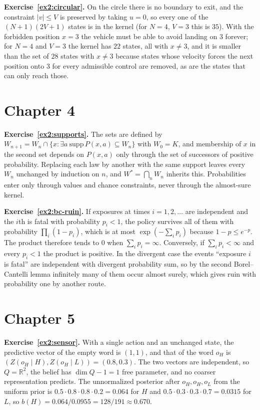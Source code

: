 \textbf{Exercise~\ref{ex2:circular}.} On the circle there is no boundary to exit, and the constraint $|v|\le V$ is preserved by taking $u=0$, so every one of the $(N+1)(2V+1)$ states is in the kernel (for $N=4$, $V=3$ this is $35$). With the forbidden position $x=3$ the vehicle must be able to avoid landing on $3$ forever; for $N=4$ and $V=3$ the kernel has $22$ states, all with $x\ne3$, and it is smaller than the set of $28$ states with $x\ne3$ because states whose velocity forces the next position onto $3$ for every admissible control are removed, as are the states that can only reach those.

\section*{Chapter 4}

\textbf{Exercise~\ref{ex2:supports}.} The sets are defined by $W_{n+1}=W_n\cap\{x:\exists a\ \mathrm{supp}\,P(x,a)\subseteq W_n\}$ with $W_0=K$, and membership of $x$ in the second set depends on $P(x,a)$ only through the set of successors of positive probability. Replacing each law by another with the same support leaves every $W_n$ unchanged by induction on $n$, and $W^{*}=\bigcap_nW_n$ inherits this. Probabilities enter only through values and chance constraints, never through the almost-sure kernel.

\textbf{Exercise~\ref{ex2:bc-ruin}.} If exposures at times $i=1,2,\dots$ are independent and the $i$th is fatal with probability $p_i<1$, the policy survives all of them with probability $\prod_i(1-p_i)$, which is at most $\exp(-\sum_ip_i)$ because $1-p\le e^{-p}$. The product therefore tends to $0$ when $\sum_ip_i=\infty$. Conversely, if $\sum_ip_i<\infty$ and every $p_i<1$ the product is positive. In the divergent case the events ``exposure $i$ is fatal'' are independent with divergent probability sum, so by the second Borel--Cantelli lemma infinitely many of them occur almost surely, which gives ruin with probability one by another route.

\section*{Chapter 5}

\textbf{Exercise~\ref{ex2:sensor}.} With a single action and an unchanged state, the predictive vector of the empty word is $(1,1)$, and that of the word $o_H$ is $(Z(o_H\mid H),Z(o_H\mid L))=(0.8,0.3)$. The two vectors are independent, so $Q=\mathbb R^{2}$, the belief has $\dim Q-1=1$ free parameter, and no coarser representation predicts. The unnormalized posterior after $o_H,o_H,o_L$ from the uniform prior is $0.5\cdot0.8\cdot0.8\cdot0.2=0.064$ for $H$ and $0.5\cdot0.3\cdot0.3\cdot0.7=0.0315$ for $L$, so $b(H)=0.064/0.0955=128/191\approx0.670$.

